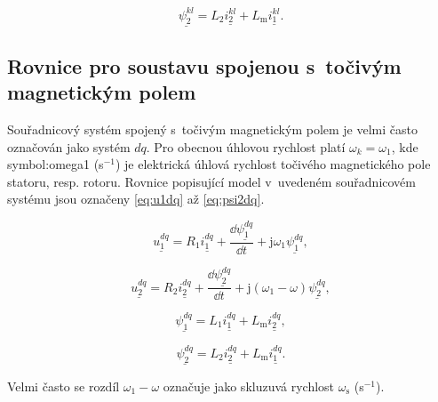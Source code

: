 \documentclass[a4paper, twoside, 11pt]{article}
\begin{document}
    \begin{equation}\label{eq:psi2kl}
        \underline{\psi_2^{kl}} = L_2 \underline{i_2^{kl}} + L_\text{m} \underline{i_1^{kl}}.
    \end{equation}

    \subsection{Rovnice pro soustavu spojenou s~točivým magnetickým polem}
    Souřadnicový systém spojený s~točivým magnetickým polem je velmi často označován jako systém $dq$. Pro obecnou úhlovou rychlost platí $\omega_k = \omega_1$, kde \gls{symbol:omega1} (s$^{-1}$) je elektrická úhlová rychlost točivého magnetického pole statoru, resp. rotoru.  Rovnice popisující model v~uvedeném souřadnicovém systému jsou označeny \ref{eq:u1dq} až \ref{eq:psi2dq}.\par

 \begin{equation}\label{eq:u1dq}
     \underline{u_{1}^{dq}} = R_1 \underline{i_1^{dq}} + \frac{\dd{\underline{\psi_1^{dq}}}}{\dd{t}} + \text{j} \omega_1 \underline{\psi_1^{dq}},
    \end{equation}

    \begin{equation}
        \underline{u_{2}^{dq}} = R_2 \underline{i_2^{dq}} + \frac{\dd{\underline{\psi_2^{dq}}}}{\dd{t}} + \text{j} (\omega_1 - \omega) \underline{\psi_2^{dq}},
    \end{equation}

    \begin{equation}
        \underline{\psi_1^{dq}} = L_1 \underline{i_1^{dq}} + L_\text{m} \underline{i_2^{dq}},
    \end{equation}

    \begin{equation}\label{eq:psi2dq}
        \underline{\psi_2^{dq}} = L_2 \underline{i_2^{dq}} + L_\text{m} \underline{i_1^{dq}}.
    \end{equation}

    Velmi často se rozdíl $\omega_1 - \omega$ označuje jako skluzuvá rychlost $\omega_\text{s}$ (s$^{-1}$).
\end{document}
